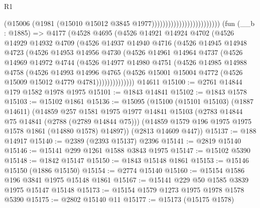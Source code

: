 \begin{lexlean}{R1}
\begin{coremodule}
                                                (@15006
                                                  (@1981
                                                    (@15010
                                                      @15012
                                                      @3845
                                                      @1977)))))))))))))))))))))))))
    (fun (__b : @1885) =>
    @4177
      (@4528
        @4695
        (@4526
          @14921
          @14924
          @4702
          (@4526
            @14929
            @14932
            @4709
            (@4526
              @14937
              @14940
              @4716
              (@4526
                @14945
                @14948
                @4723
                (@4526
                  @14953
                  @14956
                  @4730
                  (@4526
                    @14961
                    @14964
                    @4737
                    (@4526
                      @14969
                      @14972
                      @4744
                      (@4526
                        @14977
                        @14980
                        @4751
                        (@4526
                          @14985
                          @14988
                          @4758
                          (@4526
                            @14993
                            @14996
                            @4765
                            (@4526
                              @15001
                              @15004
                              @4772
                              (@4526 @15009 @15012 @4779 @4781))))))))))))))
    @14611
@15100 := @2761 @14844 @179 @1582 @1978 @1975
@15101 := @1843 @14841
@15102 := @1843 @1578
@15103 := @15102 @1861
@15136 := @15095
    (@15100
      (@15101 @15103)
      (@1887 @14611)
      (@14859
        @257
        @1581
        @1975
        @1977
        @14841
        @15103
        (@2783 @14844 @75 @14841 (@2788 (@2789 @14844 @75)))
        (@14859 @1579 @196 @1975 @1975 @1578 @1861 (@14880 @1578) @14897))
      (@2813 @14609 @447))
@15137 := @188 @14917
@15140 := @2389 (@2393 @15137) @2396
@15141 := @2819 @15140
@15146 := @15141 @299 @1261 @1588 @3843 @1975
@15147 := @15102 @5390
@15148 := @1842 @15147
@15150 := @1843 @15148 @1861
@15153 := @15146 @15150 (@1886 @15150)
@15154 := @2774 @15140
@15160 := @15154 @1586 @196 @3841 @1975 @15148 @1861
@15167 := @15141 @229 @50 @1585 @3839 @1975 @15147 @15148
@15173 := @15154 @1579 @1273 @1975 @1978 @1578 @5390
@15175 := @2802 @15140 @11
@15177 := @15173 (@15175 @1578)

\end{coremodule}
\end{lexlean}
